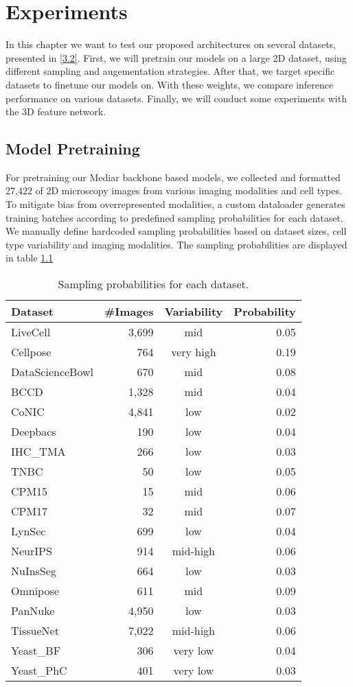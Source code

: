 \chapter{Experiments}

In this chapter we want to test our proposed architectures on several datasets, presented in \ref{3.2}. %
First, we will pretrain our models on a large 2D dataset, using different sampling and augementation strategies. After that, we target specific datasets to finetune our models on. With these weights, we compare inference performance on various datasets. Finally, we will conduct some experiments with the 3D feature network.


\section{Model Pretraining}

For pretraining our Mediar backbone based models, we collected and formatted 27,422 of 2D microscopy images from various imaging modalities and cell types. To mitigate bias from overrepresented modalities, a custom dataloader generates training batches according to predefined sampling probabilities for each dataset. We manually define hardcoded sampling probabilities based on dataset sizes, cell type variability and imaging modalities. The sampling probabilities are displayed in table \ref{tab:4.1}

\begin{table}[ht]
\centering 
\footnotesize
\caption{Sampling probabilities for each dataset.} 
\label{tab:4.1}
\begin{tabular}{l r c r} 
\hline 
\textbf{Dataset} & \textbf{\#Images} & \textbf{Variability} & \textbf{Probability} \\ 
\midrule
\midrule
LiveCell & 3,699 & mid &  0.05 \\ 
Cellpose & 764 & very high & 0.19 \\ 
DataScienceBowl & 670 & mid & 0.08 \\ 
BCCD & 1,328 & mid & 0.04 \\ 
CoNIC & 4,841 & low & 0.02 \\ 
Deepbacs & 190 & low & 0.04 \\ 
IHC\_TMA & 266 & low & 0.03 \\ 
TNBC & 50 & low & 0.05 \\ 
CPM15 & 15& mid & 0.06 \\ 
CPM17 & 32 & mid & 0.07 \\ 
LynSec & 699 & low & 0.04 \\ 
NeurIPS & 914 & mid-high & 0.06 \\ 
NuInsSeg & 664 &low & 0.03 \\
Omnipose & 611 & mid & 0.09 \\ 
PanNuke & 4,950 &low & 0.03 \\ 
TissueNet & 7,022 & mid-high & 0.06 \\ 
Yeast\_BF & 306 & very low & 0.04 \\ 
Yeast\_PhC & 401 & very low & 0.03 \\ 
\hline 
\end{tabular} 
\end{table}

